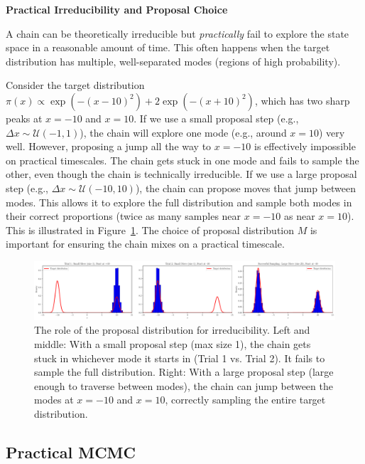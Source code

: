 \begin{warningBox}
    \textbf{Practical Irreducibility and Proposal Choice}

    A chain can be theoretically irreducible but \emph{practically} fail to explore the state space in a reasonable amount of time. This often happens when the target distribution has multiple, well-separated modes (regions of high probability).

    Consider the target distribution $\pi(x) \propto \exp(-(x-10)^2) + 2\exp(-(x+10)^2)$, which has two sharp peaks at $x=-10$ and $x=10$. If we use a small proposal step (e.g., $\Delta x \sim \mathcal{U}(-1, 1)$), the chain will explore one mode (e.g., around $x=10$) very well. However, proposing a jump all the way to $x=-10$ is effectively impossible on practical timescales. The chain gets stuck in one mode and fails to sample the other, even though the chain is technically irreducible. If we use a large proposal step (e.g., $\Delta x \sim \mathcal{U}(-10, 10)$), the chain can propose moves that jump between modes. This allows it to explore the full distribution and sample both modes in their correct proportions (twice as many samples near $x=-10$ as near $x=10$). This is illustrated in Figure~\ref{fig:mcmc-pitfall}. The choice of proposal distribution $M$ is important for ensuring the chain mixes on a practical timescale.

    \begin{figure}[H]
        \centering
        \includegraphics[width=\textwidth]{./figs/monte-carlo/mcmc_pitfall.pdf}
        \caption{The role of the proposal distribution for irreducibility. Left and middle: With a small proposal step (max size 1), the chain gets stuck in whichever mode it starts in (Trial 1 vs. Trial 2). It fails to sample the full distribution. Right: With a large proposal step (large enough to traverse between modes), the chain can jump between the modes at $x=-10$ and $x=10$, correctly sampling the entire target distribution.}
        \label{fig:mcmc-pitfall}
    \end{figure}
\end{warningBox}

\subsection{Practical MCMC}

